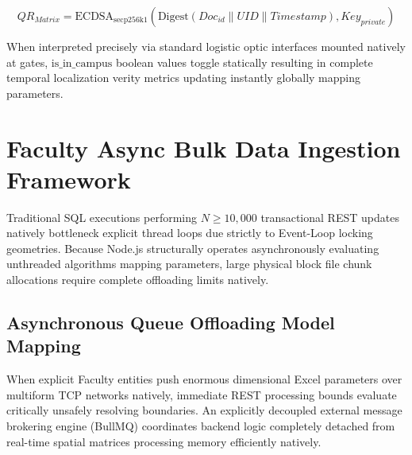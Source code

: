 \documentclass[journal,onecolumn,10pt,draftclsnofoot]{IEEEtran}
\begin{document}
\begin{equation}
    QR_{Matrix} = \text{ECDSA}_{\text{secp256k1}}(\text{Digest}(Doc_{id} \parallel UID \parallel Timestamp), Key_{private})
\end{equation}

When interpreted precisely via standard logistic optic interfaces mounted natively at gates, $\text{is\_in\_campus}$ boolean values toggle statically resulting in complete temporal localization verity metrics updating instantly globally mapping parameters.

\newpage

\section{Faculty Async Bulk Data Ingestion Framework}

Traditional SQL executions performing $N \ge 10,000$ transactional REST updates natively bottleneck explicit thread loops due strictly to Event-Loop locking geometries. Because Node.js structurally operates asynchronously evaluating unthreaded algorithms mapping parameters, large physical block file chunk allocations require complete offloading limits natively.

\subsection{Asynchronous Queue Offloading Model Mapping}
When explicit Faculty entities push enormous dimensional Excel parameters over multiform TCP networks natively, immediate REST processing bounds evaluate critically unsafely resolving boundaries. An explicitly decoupled external message brokering engine (BullMQ) coordinates backend logic completely detached from real-time spatial matrices processing memory efficiently natively.
\end{document}
